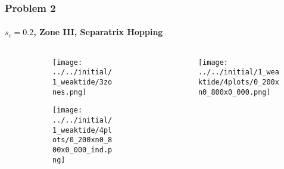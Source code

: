 \documentclass[dvipsnames, 11pt]{beamer}
\begin{document}
\begin{frame}
    \frametitle{Problem 2}
    \framesubtitle{$s_c = 0.2$, Zone III, Separatrix Hopping}

    \begin{columns}
        \begin{column}{0.5\textwidth}
            \begin{figure}
                \centering
                \begin{subfigure}{\columnwidth}
                    \centering
                    \texttt{[image: ../../initial/1\_weaktide/3zones.png]}
                \end{subfigure}

                \begin{subfigure}{\columnwidth}
                    \centering
                    \texttt{[image: ../../initial/1\_weaktide/4plots/0\_200xn0\_800x0\_000\_ind.png]}
                \end{subfigure}
            \end{figure}
        \end{column}
        \begin{column}{0.5\textwidth}
            \begin{figure}[t]
                \centering
                \texttt{[image: ../../initial/1\_weaktide/4plots/0\_200xn0\_800x0\_000.png]}
            \end{figure}
        \end{column}
    \end{columns}
\end{frame}
\end{document}
